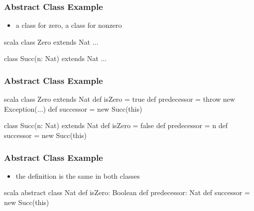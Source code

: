 \documentclass[dvipsnames]{beamer}
\theoremstyle{plain}
\begin{document}
\begin{frame}[fragile]
  \frametitle{Abstract Class Example}

  \begin{example}[Scala]
    \begin{itemize}
      \item a class for zero, a class for nonzero
    \end{itemize}

    \medskip
    \begin{pygments}{scala}
class Zero extends Nat ...

class Succ(n: Nat) extends Nat ...
    \end{pygments}
  \end{example}
\end{frame}

\begin{frame}[fragile]
  \frametitle{Abstract Class Example}

  \begin{example}[Scala]
    \begin{pygments}{scala}
class Zero extends Nat {
    def isZero = true
    def predecessor = throw new Exception(...)
    def successor = new Succ(this)
}

class Succ(n: Nat) extends Nat {
    def isZero = false
    def predecessor = n
    def successor = new Succ(this)
}
    \end{pygments}
  \end{example}
\end{frame}

\begin{frame}[fragile]
  \frametitle{Abstract Class Example}

  \begin{example}[Scala]
    \begin{itemize}
      \item the  definition is the same in both classes
    \end{itemize}

    \begin{pygments}{scala}
abstract class Nat {
    def isZero: Boolean
    def predecessor: Nat
    def successor = new Succ(this)
}
    \end{pygments}
  \end{example}
\end{frame}
\end{document}
